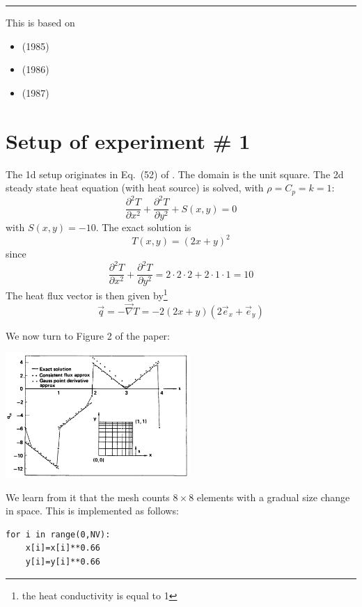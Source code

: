 \par\noindent\rule{\textwidth}{0.4pt}



This \stone is based on 
\begin{itemize}
\item {} (1985) 
\item {} (1986) 
\item {} (1987)
\end{itemize}

\section*{Setup of experiment \# 1}

The 1d setup originates in Eq.~(52) of \textcite{grls87}.
The domain is the unit square. 
The 2d steady state heat equation (with heat source) is solved, with $\rho=C_p=k=1$:
\[
\frac{\partial^2 T}{\partial x^2} + \frac{\partial^2 T}{\partial y^2} + S(x,y) = 0
\]
with $S(x,y)=-10$. 
The exact solution is 
\[
T(x,y)=(2x+y)^2
\]
since 
\[
\frac{\partial^2 T}{\partial x^2} + \frac{\partial^2 T}{\partial y^2}
= 2\cdot 2 \cdot 2 + 2 \cdot 1 \cdot 1 = 10
\]
The heat flux vector is then given by\footnote{the heat conductivity is equal to 1}
\[
\vec{q} = - \vec{\nabla} T = -2(2x+y) (2 \vec{e}_x + \vec{e}_y)
\]

We now turn to Figure 2 of the paper:
\begin{center}
\includegraphics[width=7cm]{python_codes/fieldstone_173/images/grls87a}
\end{center}

We learn from it that the mesh counts $8\times 8$ elements with a gradual size change in space.
This is implemented as follows:
\begin{lstlisting}
for i in range(0,NV):
    x[i]=x[i]**0.66
    y[i]=y[i]**0.66
\end{lstlisting}

